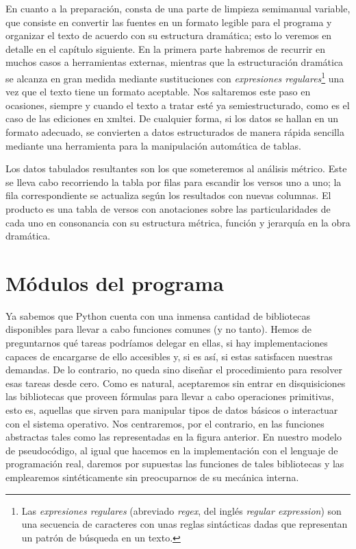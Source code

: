 En cuanto a la preparación, consta de una parte de limpieza semimanual variable, que consiste en convertir las fuentes en un formato legible para el programa y organizar el texto de acuerdo con su estructura dramática; esto lo veremos en detalle en el capítulo siguiente. En la primera parte habremos de recurrir en muchos casos a herramientas externas, mientras que la estructuración dramática se alcanza en gran medida mediante sustituciones con \textit{expresiones regulares}\footnote{Las \textit{expresiones regulares}  (abreviado \textit{\ac{regex}}, del inglés \textit{regular expression}) son una secuencia de caracteres con unas reglas sintácticas dadas que representan un patrón de búsqueda en un texto.} una vez que el texto tiene un formato aceptable. Nos saltaremos este paso en ocasiones, siempre y cuando el texto a tratar esté ya semiestructurado, como es el caso de las ediciones en \ac{xmltei}. De cualquier forma, si los datos se hallan en un formato  adecuado, se convierten a datos estructurados de manera rápida sencilla mediante una herramienta para la manipulación automática de tablas.

Los datos tabulados resultantes son los que someteremos al análisis métrico.  Este se lleva cabo recorriendo la tabla por filas para escandir los versos uno a uno; la fila correspondiente se actualiza según los resultados con nuevas columnas.  El producto es una tabla de versos con anotaciones sobre las particularidades de cada uno en consonancia con su estructura métrica, función y jerarquía en la obra dramática.

\section{Módulos del programa}
Ya sabemos que Python cuenta con una inmensa cantidad de bibliotecas disponibles para llevar a cabo funciones comunes (y no tanto). Hemos de preguntarnos qué tareas podríamos delegar en ellas, si hay implementaciones capaces de encargarse de ello accesibles y, si es así, si estas satisfacen nuestras demandas. De lo contrario, no queda sino diseñar el procedimiento para resolver esas tareas desde cero. Como es natural, aceptaremos sin entrar en disquisiciones las bibliotecas que proveen fórmulas para llevar a cabo operaciones primitivas, esto es, aquellas que sirven para manipular tipos de datos básicos o interactuar con el sistema operativo. Nos centraremos, por el contrario, en las funciones abstractas tales como las representadas en la figura anterior. En nuestro modelo de pseudocódigo, al igual que hacemos en la implementación con el lenguaje de programación real, daremos por supuestas las funciones de tales bibliotecas y las emplearemos sintéticamente sin preocuparnos de su mecánica interna.

